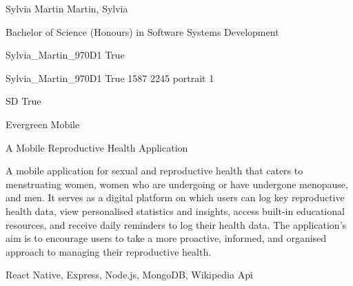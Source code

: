 
\begingroup{}\relax



\def\Key{Sylvia_Martin_970D1}

{Sylvia Martin}
{Martin, Sylvia}

{Bachelor of Science (Honours) in Software Systems Development}

{Sylvia_Martin_970D1}
{True}

{Sylvia_Martin_970D1}
{True}
{1587}
{2245}
{portrait}
{1}

{SD}
{True}

{Evergreen Mobile}

{A Mobile Reproductive Health Application}

{A mobile application for sexual and reproductive health that caters to menstruating women, women who are undergoing or have undergone menopause, and men. It serves as a digital platform on which users can log key reproductive health data, view personalised statistics and insights, access built-in educational resources, and receive daily reminders to log their health data. The application's aim is to encourage users to take a more proactive, informed, and organised approach to managing their reproductive health.}

{React Native, Express, Node.js, MongoDB, Wikipedia Api}

